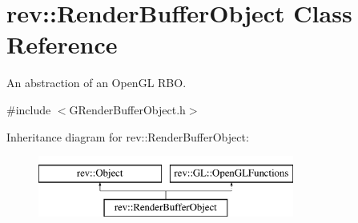 \hypertarget{classrev_1_1_render_buffer_object}{}\section{rev\+::Render\+Buffer\+Object Class Reference}
\label{classrev_1_1_render_buffer_object}


An abstraction of an Open\+GL R\+BO.  




{\ttfamily \#include $<$G\+Render\+Buffer\+Object.\+h$>$}

Inheritance diagram for rev\+::Render\+Buffer\+Object\+:\begin{figure}[H]
\begin{center}
\leavevmode
\includegraphics[height=2.000000cm]{classrev_1_1_render_buffer_object}
\end{center}
\end{figure}

